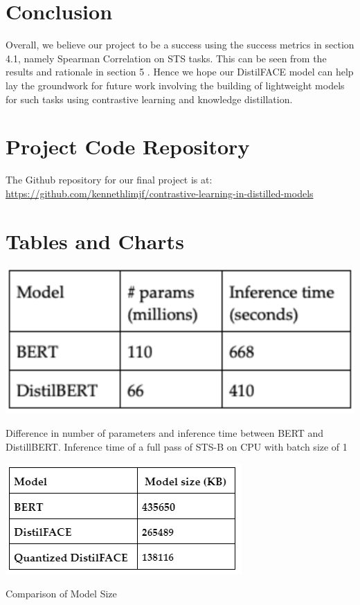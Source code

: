 \documentclass[10pt,twocolumn,letterpaper]{article}
\begin{document}
\section{Conclusion}

Overall, we believe our project to be a success using the success metrics  in section 4.1, namely Spearman Correlation on STS tasks. This can be seen from the results and rationale in section 5 . Hence we hope our DistilFACE model can help lay the groundwork for future work involving the building of lightweight models for such tasks using contrastive learning and knowledge distillation.


\begin{appendices}
        \section{Project Code Repository}
        The Github repository for our final project is at: \url{https://github.com/kennethlimjf/contrastive-learning-in-distilled-models}
        \section{Tables and Charts}

\begin{table}[hbt!]
\centering
\includegraphics[scale=0.57]{images/Bert-distilbert-comparison.png}
\caption{Difference in number of parameters and inference time between BERT and DistillBERT. Inference time of a full pass of STS-B on CPU with batch size of 1}
\label{fig:short}
\end{table}

\begin{table}[hbt!]
\centering
\includegraphics[scale=0.57]{images/Bert-distilFACE-size-comparison.png}
\caption{Comparison of Model Size}
\label{fig:short}
\end{table}


\end{appendices}
\end{document}
